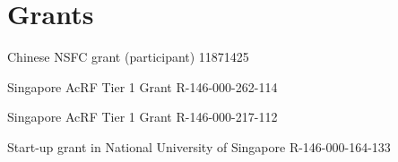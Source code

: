 \section*{Grants }

\begin{item_list}
\item 
  Chinese NSFC grant (participant) 
  11871425
\item
  Singapore AcRF Tier 1 Grant 
  R-146-000-262-114
\item
  Singapore AcRF Tier 1 Grant 
  R-146-000-217-112
\item
  Start-up grant in National University of Singapore 
  R-146-000-164-133
  
\end{item_list}



